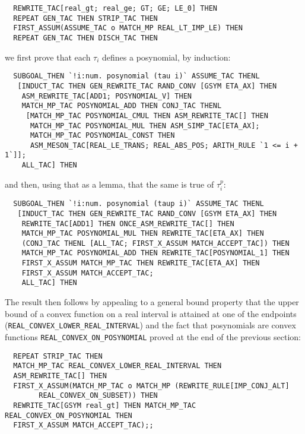 \documentclass[10pt]{article}
\theoremstyle{definition}
\theoremstyle{remark}
\numberwithin{equation}{section}
\begin{document}
\begin{scriptsize}\begin{verbatim}
  REWRITE_TAC[real_gt; real_ge; GT; GE; LE_0] THEN
  REPEAT GEN_TAC THEN STRIP_TAC THEN
  FIRST_ASSUM(ASSUME_TAC o MATCH_MP REAL_LT_IMP_LE) THEN
  REPEAT GEN_TAC THEN DISCH_TAC THEN
\end{verbatim}\end{scriptsize}

\noindent we first prove that each $\tau_i$ defines a posynomial, by induction:

\begin{scriptsize}\begin{verbatim}
  SUBGOAL_THEN `!i:num. posynomial (tau i)` ASSUME_TAC THENL
   [INDUCT_TAC THEN GEN_REWRITE_TAC RAND_CONV [GSYM ETA_AX] THEN
    ASM_REWRITE_TAC[ADD1; POSYNOMIAL_V] THEN
    MATCH_MP_TAC POSYNOMIAL_ADD THEN CONJ_TAC THENL
     [MATCH_MP_TAC POSYNOMIAL_CMUL THEN ASM_REWRITE_TAC[] THEN
      MATCH_MP_TAC POSYNOMIAL_MUL THEN ASM_SIMP_TAC[ETA_AX];
      MATCH_MP_TAC POSYNOMIAL_CONST THEN
      ASM_MESON_TAC[REAL_LE_TRANS; REAL_ABS_POS; ARITH_RULE `1 <= i + 1`]];
    ALL_TAC] THEN
\end{verbatim}\end{scriptsize}

\noindent and then, using that as a lemma, that the same is true of $\tau^p_i$:

\begin{scriptsize}\begin{verbatim}
  SUBGOAL_THEN `!i:num. posynomial (taup i)` ASSUME_TAC THENL
   [INDUCT_TAC THEN GEN_REWRITE_TAC RAND_CONV [GSYM ETA_AX] THEN
    REWRITE_TAC[ADD1] THEN ONCE_ASM_REWRITE_TAC[] THEN
    MATCH_MP_TAC POSYNOMIAL_MUL THEN REWRITE_TAC[ETA_AX] THEN
    (CONJ_TAC THENL [ALL_TAC; FIRST_X_ASSUM MATCH_ACCEPT_TAC]) THEN
    MATCH_MP_TAC POSYNOMIAL_ADD THEN REWRITE_TAC[POSYNOMIAL_1] THEN
    FIRST_X_ASSUM MATCH_MP_TAC THEN REWRITE_TAC[ETA_AX] THEN
    FIRST_X_ASSUM MATCH_ACCEPT_TAC;
    ALL_TAC] THEN
\end{verbatim}\end{scriptsize}

The result then follows by appealing to a general bound property that the upper
bound of a convex function on a real interval is attained at one of the
endpoints ({\verb|REAL_CONVEX_LOWER_REAL_INTERVAL|}) and the fact that
posynomials are convex functions {\verb|REAL_CONVEX_ON_POSYNOMIAL|} proved at
the end of the previous section:

\begin{scriptsize}\begin{verbatim}
  REPEAT STRIP_TAC THEN
  MATCH_MP_TAC REAL_CONVEX_LOWER_REAL_INTERVAL THEN
  ASM_REWRITE_TAC[] THEN
  FIRST_X_ASSUM(MATCH_MP_TAC o MATCH_MP (REWRITE_RULE[IMP_CONJ_ALT]
        REAL_CONVEX_ON_SUBSET)) THEN
  REWRITE_TAC[GSYM real_gt] THEN MATCH_MP_TAC REAL_CONVEX_ON_POSYNOMIAL THEN
  FIRST_X_ASSUM MATCH_ACCEPT_TAC);;
\end{verbatim}\end{scriptsize}
\end{document}
